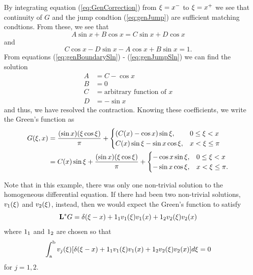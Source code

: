     By integrating equation (\ref{eq:GenCorrection}) from \(\xi = x^-\) to \(\xi = x^+\) we see that continuity of \(G\) and the jump condtion (\ref{eq:genJump}) are sufficient matching condtions. From these, we see that 
    \begin{equation}
        A\sin x + B\cos x = C\sin x + D\cos x
    \end{equation}
    and 
    \begin{equation}\label{eq:genJumpSln}
        C\cos x - D\sin x -A \cos x + B\sin x = 1.
    \end{equation}
    From equations (\ref{eq:genBoundarySln}) - (\ref{eq:genJumpSln}) we can find the solution
    \begin{equation*}
        \begin{split}
            A &= C - \cos x\\
            B &= 0\\
            C &= \text{arbitrary function of } x\\
            D &= -\sin x
        \end{split}
    \end{equation*}
    and thus, we have resolved the contraction. Knowing these coefficients, we write the Green's function as
    \begin{equation*}
        \begin{split}
            G(\xi,x) &= \frac{(\sin x)(\xi\cos \xi)}{\pi} + \begin{cases}
                (C(x)-\cos x)\sin\xi, & 0\leq\xi < x\\
                C(x)\sin\xi -\sin x \cos\xi, & x < \xi \leq \pi
            \end{cases}\\
            &= C(x)\sin \xi + \frac{(\sin x)(\xi\cos \xi)}{\pi} + \begin{cases}
                -\cos x \sin\xi, & 0\leq\xi < x\\
                -\sin x \cos\xi, & x < \xi \leq \pi.
            \end{cases}
        \end{split}
    \end{equation*}

    Note that in this example, there was only one non-trivial solution to the homogeneous differential equation. If there had been two non-trivial solutions, \(v_1(\xi)\) and \(v_2(\xi)\), instead, then we would expect the Green's function to satisfy 
    \begin{equation*}
        \mathrm{\bf{L^*}} G = \delta(\xi-x) +1_1 v_1(\xi)v_1(x) + 1_2 v_2(\xi)v_2(x)
    \end{equation*}
    where \(1_1\) and \(1_2\) are chosen so that 
    \begin{equation*}
        \int_{\mathrm{a}}^{\mathrm{b}} v_j(\xi)[\delta(\xi-x) +1_1 v_1(\xi)v_1(x) + 1_2 v_2(\xi)v_2(x)]d\xi = 0
    \end{equation*} 
    for \(j=1,2\).
